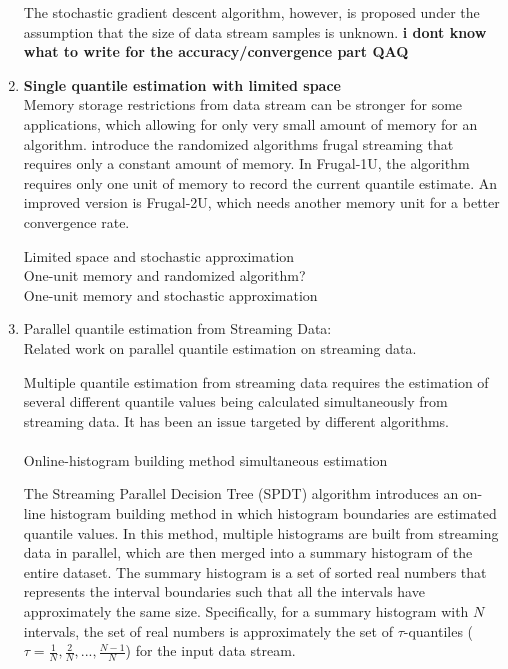 \documentclass[12pt]{article}
\begin{document}
\begin{enumerate}
    The stochastic gradient descent algorithm, however, is proposed under the assumption that the size of data stream samples is unknown. \textbf{i dont know what to write for the accuracy/convergence part QAQ}

    \pagebreak
    \item \textbf{
        Single quantile estimation with limited space\\
    }
    Memory storage restrictions from data stream can be stronger for some applications, which allowing for only very small amount of memory for an algorithm. \citeauthor{maFrugalStreamingEstimating2014} \cite{maFrugalStreamingEstimating2014} introduce the randomized algorithms frugal streaming that requires only a constant amount of memory. In Frugal-1U, the algorithm requires only one unit of memory to record the current quantile estimate. An improved version is Frugal-2U, which needs another memory unit for a better convergence rate. 



    Limited space and stochastic approximation\cite{tierneySpaceEfficientRecursiveProcedure1983}\\



    One-unit memory and randomized algorithm? \cite{maFrugalStreamingEstimating2014}\\

    One-unit memory and stochastic approximation \cite{yazidiQuantileEstimationDynamic2016}\\

    \pagebreak    
    \item Parallel quantile estimation from Streaming Data: \\
        Related work on parallel quantile estimation on streaming data.



        Multiple quantile estimation from streaming data requires the estimation of several different quantile values being calculated simultaneously from streaming data. It has been an issue targeted by different algorithms.\\\\

        Online-histogram building method simultaneous estimation\cite{ben-haimStreamingParallelDecision} 

        The Streaming Parallel Decision Tree (SPDT) algorithm \cite{ben-haimStreamingParallelDecision} introduces an on-line histogram building method %
        in which histogram boundaries are estimated quantile values.
        In this method, multiple histograms are built from streaming data in parallel, which are then merged into a summary histogram of the entire dataset. The summary histogram is a set of sorted real numbers that represents the interval boundaries such that all the intervals have approximately the same size. Specifically, for a summary histogram with $N$ intervals, the set of real numbers is approximately the set of $\tau$-quantiles ($\tau = \frac{1}{N}, \frac{2}{N}, ..., \frac{N-1}{N}$) for the input data stream.


\end{enumerate}
\end{document}
